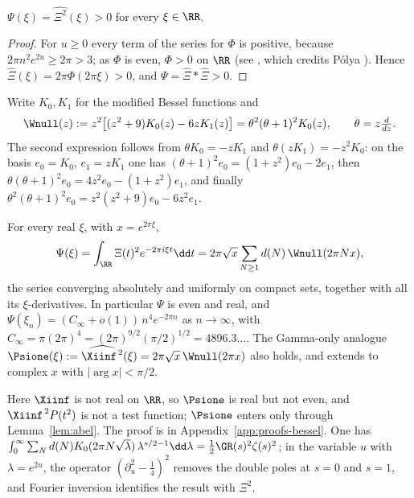 \begin{lemma}\label{lem:Psi-pos}
$\Psi(\xi)=\widehat{\Xi^2}(\xi)>0$ for every $\xi\in\RR$.
\end{lemma}

\begin{proof}
For $u\ge0$ every term of the series for $\Phi$ is positive, because $2\pi n^2e^{2u}\ge2\pi>3$; as
$\Phi$ is even, $\Phi>0$ on $\RR$ (see \cite[Theorem~A(i)]{CNV86}, which credits P\'olya \cite{Pol27}). Hence
$\widehat\Xi(\xi)=2\pi\Phi(2\pi\xi)>0$, and $\Psi=\widehat\Xi*\widehat\Xi>0$.
\end{proof}

Write $K_0,K_1$ for the modified Bessel functions and
\begin{equation}\label{eq:W0}
\Wnull(z):=z^2\bigl[(z^2+9)K_0(z)-6zK_1(z)\bigr]=\theta^2(\theta+1)^2K_0(z),\qquad \theta=z\tfrac{d}{dz}.
\end{equation}
The second expression follows from $\theta K_0=-zK_1$ and $\theta(zK_1)=-z^2K_0$: on the basis
$e_0=K_0$, $e_1=zK_1$ one has $(\theta+1)^2e_0=(1+z^2)e_0-2e_1$, then
$\theta(\theta+1)^2e_0=4z^2e_0-(1+z^2)e_1$, and finally
$\theta^2(\theta+1)^2e_0=z^2(z^2+9)e_0-6z^2e_1$.

\begin{proposition}\label{thm:bessel}
For every real $\xi$, with $x=e^{2\pi\xi}$,
\[
\Psi(\xi)=\int_\RR\Xi(t)^2e^{-2\pi i\xi t}\dd t=2\pi\sqrt x\sum_{N\ge1}d(N)\,\Wnull(2\pi Nx),
\]
the series converging absolutely and uniformly on compact sets, together with all its
$\xi$-derivatives. In particular $\Psi$ is even and real, and
$\Psi(\xi_n)=(C_\infty+o(1))\,n^4e^{-2\pi n}$ as $n\to\infty$, with
$C_\infty=\pi(2\pi)^4=(2\pi)^{9/2}(\pi/2)^{1/2}=4896.3\ldots$.
The Gamma-only analogue
$\Psione(\xi):=\widehat{\Xiinf^{\,2}}(\xi)=2\pi\sqrt x\,\Wnull(2\pi x)$ also holds, and extends to complex
$x$ with $\lvert\arg x\rvert<\pi/2$.
\end{proposition}

Here $\Xiinf$ is not real on $\RR$, so $\Psione$ is real but not even, and $\Xiinf^{\,2}P(t^2)$ is not a test function; $\Psione$ enters only
through Lemma~\ref{lem:abel}. The proof is in Appendix~\ref{app:proofs-bessel}. One has
$\int_0^\infty\sum_Nd(N)K_0(2\pi N\sqrt\lambda)\,\lambda^{s/2-1}\dd\lambda=\frac12\GR(s)^2\zeta(s)^2$; in the variable $u$ with $\lambda=e^{2u}$, the operator $(\partial_u^2-\frac14)^2$ removes the double poles
at $s=0$ and $s=1$, and Fourier inversion identifies the result with $\Xi^2$.

